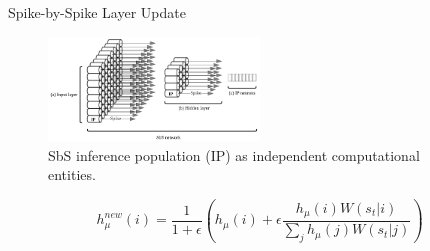 \begin{frame}{Spike-by-Spike Layer Update}
	\begin{figure}
		\centering
		\includegraphics[width=0.5\textwidth]{../chapters/sbs_accelerator/figures/SbS_layer.pdf}
		\caption{\scriptsize SbS inference population (IP) as independent computational entities.}
	\end{figure}
	
	
	{\scriptsize
		\[
		h_\mu^{new}(i) = \frac{1}{1+\epsilon} \left(h_\mu(i) + \epsilon \frac{h_\mu(i) W(s_t|i) }{\sum_j h_\mu(j) W(s_t|j)} \right) 
		\]
	}
\end{frame}

